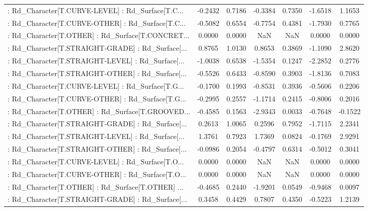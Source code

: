 \begin{longtable}{p{4cm}cccccc}
 : Rd\_Character[T.CURVE-LEVEL] : Rd\_Surface[T.C... & -0.2432 &    0.7186 & -0.3384 &       0.7350 & -1.6518 &  1.1653 \\
 : Rd\_Character[T.CURVE-OTHER] : Rd\_Surface[T.C... & -0.5082 &    0.6554 & -0.7754 &       0.4381 & -1.7930 &  0.7765 \\
 : Rd\_Character[T.OTHER] : Rd\_Surface[T.CONCRET... &  0.0000 &    0.0000 &     NaN &          NaN &  0.0000 &  0.0000 \\
 : Rd\_Character[T.STRAIGHT-GRADE] : Rd\_Surface[... &  0.8765 &    1.0130 &  0.8653 &       0.3869 & -1.1090 &  2.8620 \\
 : Rd\_Character[T.STRAIGHT-LEVEL] : Rd\_Surface[... & -1.0038 &    0.6538 & -1.5354 &       0.1247 & -2.2852 &  0.2776 \\
 : Rd\_Character[T.STRAIGHT-OTHER] : Rd\_Surface[... & -0.5526 &    0.6433 & -0.8590 &       0.3903 & -1.8136 &  0.7083 \\
 : Rd\_Character[T.CURVE-LEVEL] : Rd\_Surface[T.G... & -0.1700 &    0.1993 & -0.8531 &       0.3936 & -0.5606 &  0.2206 \\
 : Rd\_Character[T.CURVE-OTHER] : Rd\_Surface[T.G... & -0.2995 &    0.2557 & -1.1714 &       0.2415 & -0.8006 &  0.2016 \\
 : Rd\_Character[T.OTHER] : Rd\_Surface[T.GROOVED... & -0.4585 &    0.1563 & -2.9343 &       0.0033 & -0.7648 & -0.1522 \\
 : Rd\_Character[T.STRAIGHT-GRADE] : Rd\_Surface[... &  0.2613 &    1.0065 &  0.2596 &       0.7952 & -1.7115 &  2.2341 \\
 : Rd\_Character[T.STRAIGHT-LEVEL] : Rd\_Surface[... &  1.3761 &    0.7923 &  1.7369 &       0.0824 & -0.1769 &  2.9291 \\
 : Rd\_Character[T.STRAIGHT-OTHER] : Rd\_Surface[... & -0.0986 &    0.2054 & -0.4797 &       0.6314 & -0.5012 &  0.3041 \\
 : Rd\_Character[T.CURVE-LEVEL] : Rd\_Surface[T.O... &  0.0000 &    0.0000 &     NaN &          NaN &  0.0000 &  0.0000 \\
 : Rd\_Character[T.CURVE-OTHER] : Rd\_Surface[T.O... &  0.0000 &    0.0000 &     NaN &          NaN &  0.0000 &  0.0000 \\
 : Rd\_Character[T.OTHER] : Rd\_Surface[T.OTHER] ... & -0.4685 &    0.2440 & -1.9201 &       0.0549 & -0.9468 &  0.0097 \\
 : Rd\_Character[T.STRAIGHT-GRADE] : Rd\_Surface[... &  0.3458 &    0.4429 &  0.7807 &       0.4350 & -0.5223 &  1.2139 \\

\end{longtable}
